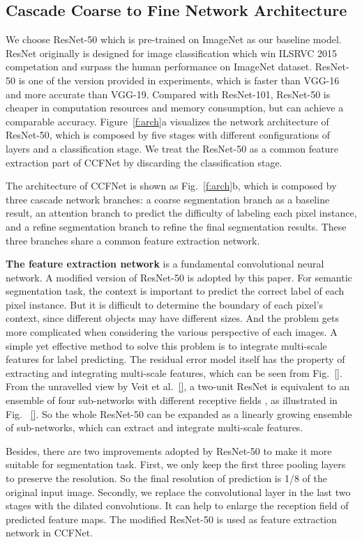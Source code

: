 \documentclass[10.5pt,compsoc]{TsT}
\theoremstyle{mystyle}
\begin{document}
{\subsection{Cascade Coarse to Fine Network Architecture}
\label{s:arch}
\noindent

We choose ResNet-50 which is pre-trained on ImageNet as our baseline model. ResNet originally is designed for image classification which win ILSRVC 2015 competation and surpass the human performance on ImageNet dataset.
ResNet-50 is one of the version provided in experiments, which is faster than VGG-16 and more accurate than VGG-19.
Compared with ResNet-101, ResNet-50 is cheaper in computation resources and memory consumption, but can achieve a comparable accuracy.
Figure~\ref{f:arch}a  visualizes the network architecture of ResNet-50, which is composed by five stages with different configurations of layers and a classification stage.
We treat the ResNet-50 as a common feature extraction part of CCFNet by discarding the classification stage.


The architecture of CCFNet is shown as Fig.~\ref{f:arch}b, which is composed by three cascade network branches: a coarse segmentation branch as a baseline result, an attention branch to predict the difficulty of labeling each pixel instance, and a refine segmentation branch to refine the final segmentation results. 
These three branches share a common feature extraction network.

\textbf{The feature extraction network} is a fundamental convolutional neural network.
A modified version of ResNet-50 is adopted by this paper.
For semantic segmentation task,  the context is important to predict the correct label of each pixel instance.
But it is difficult to determine the boundary of each pixel's context, since different objects may have different sizes.
And the problem gets more complicated when considering the various perspective of each images.
A simple yet effective method to solve this problem is to integrate multi-scale features for label predicting.
The residual error model itself has the property of extracting and integrating multi-scale features, which can be seen from Fig.~\ref{}.
From the unravelled view by Veit et al.~\ref{}, a two-unit ResNet is equivalent to an ensemble of four sub-networks with different receptive fields , as illustrated in Fig. ~\ref{}.
So the whole ResNet-50 can be expanded as a linearly growing ensemble of sub-networks, which can extract and integrate multi-scale features.

Besides, there are two improvements adopted by ResNet-50 to make it more suitable for segmentation task.
First, we only keep the first three pooling layers to preserve the resolution.
So the final resolution of prediction is 1/8 of the original input image. 
Secondly, we replace the convolutional layer in the last two stages with the dilated convolutions.
It can help to enlarge the reception field of predicted feature maps.
The modified ResNet-50 is used as feature extraction network in CCFNet.

}
\end{document}
